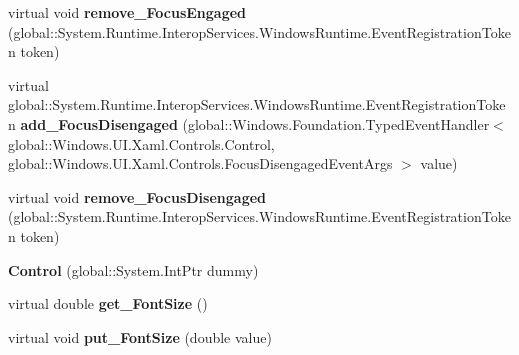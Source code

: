 \begin{DoxyCompactItemize}
\item 
\mbox{\label{class_windows_1_1_u_i_1_1_xaml_1_1_controls_1_1_control_aae2dfe22e085e480a19bdb599b17d9bb}} 
virtual void {\bfseries remove\+\_\+\+Focus\+Engaged} (global\+::\+System.\+Runtime.\+Interop\+Services.\+Windows\+Runtime.\+Event\+Registration\+Token token)
\item 
\mbox{\label{class_windows_1_1_u_i_1_1_xaml_1_1_controls_1_1_control_a37520b52e70f32ebd8cf57ee3b584dcf}} 
virtual global\+::\+System.\+Runtime.\+Interop\+Services.\+Windows\+Runtime.\+Event\+Registration\+Token {\bfseries add\+\_\+\+Focus\+Disengaged} (global\+::\+Windows.\+Foundation.\+Typed\+Event\+Handler$<$ global\+::\+Windows.\+U\+I.\+Xaml.\+Controls.\+Control, global\+::\+Windows.\+U\+I.\+Xaml.\+Controls.\+Focus\+Disengaged\+Event\+Args $>$ value)
\item 
\mbox{\label{class_windows_1_1_u_i_1_1_xaml_1_1_controls_1_1_control_a8242a4de1e17e601516c00e9e14f7415}} 
virtual void {\bfseries remove\+\_\+\+Focus\+Disengaged} (global\+::\+System.\+Runtime.\+Interop\+Services.\+Windows\+Runtime.\+Event\+Registration\+Token token)
\item 
\mbox{\label{class_windows_1_1_u_i_1_1_xaml_1_1_controls_1_1_control_ac6f409bd00a64ebd932806d0bd90b1cf}} 
{\bfseries Control} (global\+::\+System.\+Int\+Ptr dummy)
\item 
\mbox{\label{class_windows_1_1_u_i_1_1_xaml_1_1_controls_1_1_control_a56b25a73046ea0559a9e7cc2806702e8}} 
virtual double {\bfseries get\+\_\+\+Font\+Size} ()
\item 
\mbox{\label{class_windows_1_1_u_i_1_1_xaml_1_1_controls_1_1_control_af511651d84c62e096804d65532964059}} 
virtual void {\bfseries put\+\_\+\+Font\+Size} (double value)
\item 
\mbox{\label{class_windows_1_1_u_i_1_1_xaml_1_1_controls_1_1_control_ad993e612b853d9afcb875a5e4234fcc1}} 

\end{DoxyCompactItemize}
